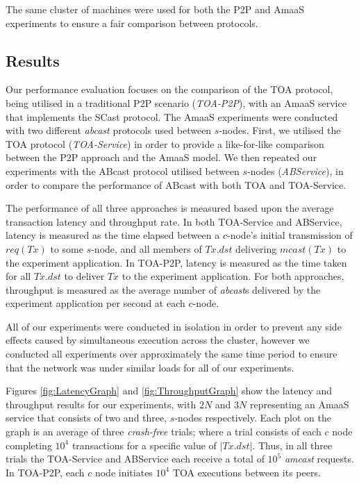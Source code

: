 	The same cluster of machines were used for both the P2P and \textsf{AmaaS} experiments to ensure a fair comparison between protocols.   
	
	\subsection{Results}\label{sec:AmaaS_results}
	Our performance evaluation focuses on the comparison of the TOA protocol, being utilised in a traditional P2P scenario (\emph{TOA-P2P}), with an \textsf{AmaaS} service that implements the \textsf{SCast} protocol.  The \textsf{AmaaS} experiments were conducted with two different \emph{abcast} protocols used between $s$-nodes.  First, we utilised the TOA protocol (\emph{TOA-Service}) in order to provide a like-for-like comparison between the P2P approach and the \textsf{AmaaS} model. We then repeated our experiments with the \textsf{ABcast} protocol utilised between $s$-nodes (\emph{ABService}), in order to compare the performance of \textsf{ABcast} with both TOA and TOA-Service.  
    
    The performance of all three approaches is measured based upon the average transaction latency and throughput rate. In both TOA-Service and ABService, latency is measured as the time elapsed between a $c$-node's initial transmission of $req(Tx)$ to some $s$-node, and all members of $Tx.dst$ delivering $mcast(Tx)$ to the experiment application. In TOA-P2P, latency is measured as the time taken for all $Tx.dst$ to deliver $Tx$ to the experiment application. For both approaches, throughput is measured as the average number of \emph{abcast}s delivered by the experiment application per second at each $c$-node.
	
	All of our experiments were conducted in isolation in order to prevent any side effects caused by simultaneous execution across the cluster, however we conducted all experiments over approximately the same time period to ensure that the network was under similar loads for all of our experiments. 
	
	Figures \ref{fig:LatencyGraph} and \ref{fig:ThroughputGraph} show the latency and throughput results for our experiments, with $2N$ and $3N$ representing an \textsf{AmaaS} service that consists of two and three, $s$-nodes respectively.  Each plot on the graph is an average of three \emph{crash-free} trials; where a trial consists of each $c$ node completing $10^4$ transactions for a specific value of $|Tx.dst|$. Thus, in all three trials the TOA-Service and ABService each receive a total of $10^5$ \emph{amcast} requests. In TOA-P2P, each $c$ node initiates $10^4$ TOA executions between its peers.  
	
